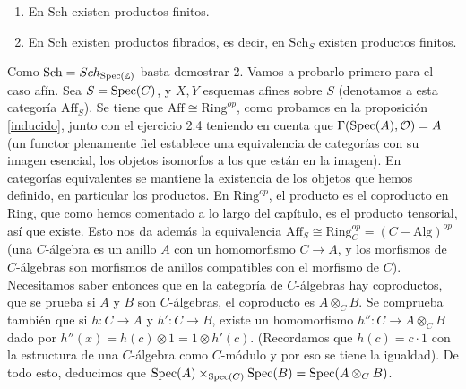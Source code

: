 \documentclass[GA.tex]{subfiles}
\begin{document}
\begin{teorema}
\begin{enumerate}
\item En $\mathrm{Sch}$ existen productos finitos. 
\item En $\mathrm{Sch}$ existen productos fibrados, es decir, en $\mathrm{Sch}_S$ existen productos finitos.
\end{enumerate}
\end{teorema}
\begin{dem}
Como $\mathrm{Sch}=Sch_{\operatorname{Spec}(\mathbb{Z})}$ basta demostrar 2. Vamos a probarlo primero para el caso afín. Sea $S=\operatorname{Spec}(C)$, y $X,Y$ esquemas afines sobre $S$ (denotamos a esta categoría $\mathrm{Aff}_S$). Se tiene que $\mathrm{Aff}\cong \mathrm{Ring}^{op}$, como probamos en la proposición \ref{inducido}, junto con el ejercicio 2.4 teniendo en cuenta que $\Gamma(\operatorname{Spec}(A),{\mathcal O})=A$ (un functor plenamente fiel establece una equivalencia de categorías con su imagen esencial, los objetos isomorfos a los que están en la imagen). En categorías equivalentes se mantiene la existencia de los objetos que hemos definido, en particular los productos. En $\mathrm{Ring}^{op}$, el producto es el coproducto en $\mathrm{Ring}$, que como hemos comentado a lo largo del capítulo, es el producto tensorial, así que existe. Esto nos da además la equivalencia $\mathrm{Aff}_S\cong\mathrm{Ring}_C^{op}=(C-\mathrm{Alg})^{op}$ (una $C$-álgebra es un anillo $A$ con un homomorfismo $C\to A$, y los morfismos de $C$-álgebras son morfismos de anillos compatibles con el morfismo de $C$). Necesitamos saber entonces que en la categoría de $C$-álgebras hay coproductos, que se prueba si $A$ y $B$ son $C$-álgebras, el coproducto es $A\otimes_C B$. Se comprueba también que si $h:C\to A$ y $h':C\to B$, existe un homomorfismo $h'':C\to A\otimes_C B$ dado por $h''(x)=h(c)\otimes 1=1\otimes h'(c)$. (Recordamos que $h(c)=c\cdot 1$ con la estructura de una $C$-álgebra como $C$-módulo y por eso se tiene la igualdad). De todo esto, deducimos que $\operatorname{Spec}(A)\times_{\operatorname{Spec}(C)}\operatorname{Spec}(B)=\operatorname{Spec}(A\otimes_C B)$. 


\end{dem}
\end{document}
